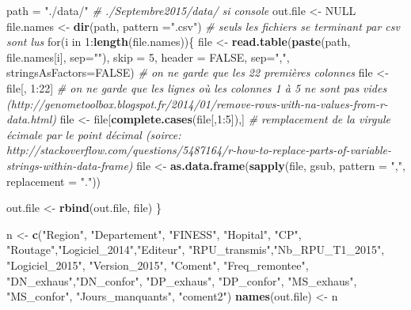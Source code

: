 \documentclass[]{article}
\newenvironment{Shaded}{\begin{snugshade}}{\end{snugshade}}
\newcommand{\KeywordTok}[1]{\textcolor[rgb]{0.13,0.29,0.53}{\textbf{{#1}}}}
\newcommand{\DataTypeTok}[1]{\textcolor[rgb]{0.13,0.29,0.53}{{#1}}}
\newcommand{\DecValTok}[1]{\textcolor[rgb]{0.00,0.00,0.81}{{#1}}}
\newcommand{\StringTok}[1]{\textcolor[rgb]{0.31,0.60,0.02}{{#1}}}
\newcommand{\CommentTok}[1]{\textcolor[rgb]{0.56,0.35,0.01}{\textit{{#1}}}}
\newcommand{\OtherTok}[1]{\textcolor[rgb]{0.56,0.35,0.01}{{#1}}}
\newcommand{\NormalTok}[1]{{#1}}
\begin{document}
\begin{Shaded}
\begin{Highlighting}[]
\NormalTok{path =}\StringTok{ "./data/"} \CommentTok{# ./Septembre2015/data/ si console}
\NormalTok{out.file <-}\StringTok{ }\OtherTok{NULL}
\NormalTok{file.names <-}\StringTok{ }\KeywordTok{dir}\NormalTok{(path, }\DataTypeTok{pattern =}\StringTok{".csv"}\NormalTok{) }\CommentTok{# seuls les fichiers se terminant par csv sont lus}
\NormalTok{for(i in }\DecValTok{1}\NormalTok{:}\KeywordTok{length}\NormalTok{(file.names))\{}
   \NormalTok{file <-}\StringTok{ }\KeywordTok{read.table}\NormalTok{(}\KeywordTok{paste}\NormalTok{(path, file.names[i], }\DataTypeTok{sep=}\StringTok{""}\NormalTok{), }\DataTypeTok{skip =} \DecValTok{5}\NormalTok{, }\DataTypeTok{header =} \OtherTok{FALSE}\NormalTok{, }\DataTypeTok{sep=}\StringTok{","}\NormalTok{, }\DataTypeTok{stringsAsFactors=}\OtherTok{FALSE}\NormalTok{)}
   \CommentTok{# on ne garde que les 22 premières colonnes}
   \NormalTok{file <-}\StringTok{ }\NormalTok{file[, }\DecValTok{1}\NormalTok{:}\DecValTok{22}\NormalTok{]}
   \CommentTok{# on ne garde que les lignes où les colonnes 1 à 5 ne sont pas vides (http://genometoolbox.blogspot.fr/2014/01/remove-rows-with-na-values-from-r-data.html)}
   \NormalTok{file <-}\StringTok{ }\NormalTok{file[}\KeywordTok{complete.cases}\NormalTok{(file[,}\DecValTok{1}\NormalTok{:}\DecValTok{5}\NormalTok{]),]}
   \CommentTok{# remplacement de la virgule écimale par le point décimal (soirce: http://stackoverflow.com/questions/5487164/r-how-to-replace-parts-of-variable-strings-within-data-frame)}
   \NormalTok{file <-}\StringTok{ }\KeywordTok{as.data.frame}\NormalTok{(}\KeywordTok{sapply}\NormalTok{(file, gsub, }\DataTypeTok{pattern =} \StringTok{","}\NormalTok{, }\DataTypeTok{replacement =} \StringTok{"."}\NormalTok{))}

   \NormalTok{out.file <-}\StringTok{ }\KeywordTok{rbind}\NormalTok{(out.file, file)}
 \NormalTok{\}}

\NormalTok{n <-}\StringTok{ }\KeywordTok{c}\NormalTok{(}\StringTok{"Region"}\NormalTok{, }\StringTok{"Departement"}\NormalTok{, }\StringTok{"FINESS"}\NormalTok{, }\StringTok{"Hopital"}\NormalTok{, }\StringTok{"CP"}\NormalTok{, }\StringTok{"Routage"}\NormalTok{,}\StringTok{"Logiciel_2014"}\NormalTok{,}\StringTok{"Editeur"}\NormalTok{, }\StringTok{"RPU_transmis"}\NormalTok{,}\StringTok{"Nb_RPU_T1_2015"}\NormalTok{, }\StringTok{"Logiciel_2015"}\NormalTok{, }\StringTok{"Version_2015"}\NormalTok{, }\StringTok{"Coment"}\NormalTok{, }\StringTok{"Freq_remontee"}\NormalTok{, }\StringTok{"DN_exhaus"}\NormalTok{,}\StringTok{"DN_confor"}\NormalTok{, }\StringTok{"DP_exhaus"}\NormalTok{, }\StringTok{"DP_confor"}\NormalTok{, }\StringTok{"MS_exhaus"}\NormalTok{, }\StringTok{"MS_confor"}\NormalTok{, }\StringTok{"Jours_manquants"}\NormalTok{, }\StringTok{"coment2"}\NormalTok{)}
 \KeywordTok{names}\NormalTok{(out.file) <-}\StringTok{ }\NormalTok{n}


\end{Highlighting}
\end{Shaded}
\end{document}
